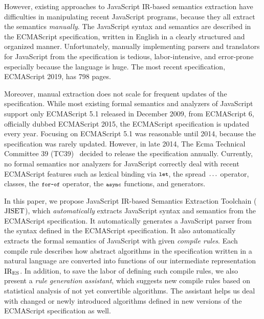However, existing approaches to JavaScript IR-based semantics
extraction have difficulties in manipulating recent JavaScript
programs, because they all extract the semantics \textit{manually}.
The JavaScript syntax and semantics are described in the ECMAScript
specification, written in English in a clearly structured and
organized manner.  Unfortunately, manually implementing parsers and
translators for JavaScript from the specification is tedious,
labor-intensive, and error-prone especially because the language is
huge.  The most recent specification, ECMAScript 2019, has 798 pages.

Moreover, manual extraction does not scale for frequent updates of the
specification.  While most existing formal semantics and analyzers of
JavaScript support only ECMAScript 5.1 released in December 2009,
from ECMAScript 6, officially dubbed ECMAScript 2015, the 
ECMAScript specification is updated every year.  Focusing on
ECMAScript 5.1 was reasonable until 2014, because the
specification was rarely updated.  However, in late 2014, The Ecma
Technical Committee 39 (TC39)~\cite{tc39} decided to release the
specification annually.  Currently, no formal semantics
nor analyzers for JavaScript correctly deal with recent ECMAScript
features such as lexical binding via \( \texttt{\footnotesize let} \), the spread
\( \texttt{\footnotesize...} \) operator, classes, the \( \texttt{\footnotesize for-of} \) operator,
the \( \texttt{\footnotesize async} \) functions, and generators.

In this paper, we propose JavaScript IR-based Semantics Extraction
Toolchain (\( \text{JISET} \)), which \textit{automatically} extracts JavaScript
syntax and semantics from the ECMAScript specification.  It
automatically generates a JavaScript parser from the syntax defined in
the ECMAScript specification.  It also automatically extracts the
formal semantics of JavaScript with given \textit{compile rules}.
Each compile rule describes how abstract algorithms in the
specification written in a natural language are converted into
functions of our intermediate representation \( \text{IR}_\text{ES} \).  In
addition, to save the labor of defining such compile rules, we also
present a \textit{rule generation assistant}, which suggests new
compile rules based on statistical analysis of not yet convertible
algorithms.  The assistant helps us deal with changed or newly
introduced algorithms defined in new versions of the ECMAScript
specification as well.

